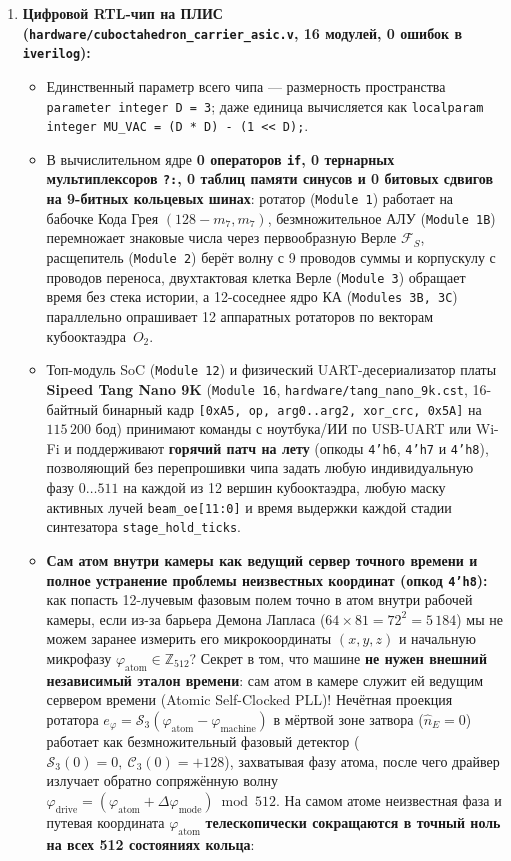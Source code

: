 \begin{enumerate}[label=\textbf{\arabic*.},leftmargin=*]
\item \textbf{Цифровой RTL-чип на ПЛИС (\texttt{hardware/cuboctahedron\_carrier\_asic.v}, 16 модулей, 0 ошибок в \texttt{iverilog}):}
  \begin{itemize}[noitemsep]
  \item Единственный параметр всего чипа --- размерность пространства \texttt{parameter integer D = 3}; даже единица вычисляется как \texttt{localparam integer MU\_VAC = (D * D) - (1 << D);}.
  \item В вычислительном ядре \textbf{0 операторов \texttt{if}, 0 тернарных мультиплексоров \texttt{?:}, 0 таблиц памяти синусов и 0 битовых сдвигов на 9-битных кольцевых шинах}: ротатор (\texttt{Module~1}) работает на бабочке Кода Грея $(128 - m_7, m_7)$, безмножительное АЛУ (\texttt{Module~1B}) перемножает знаковые числа через первообразную Верле $\mathcal{F}_S$, расщепитель (\texttt{Module~2}) берёт волну с 9 проводов суммы и корпускулу с проводов переноса, двухтактовая клетка Верле (\texttt{Module~3}) обращает время без стека истории, а 12-соседнее ядро КА (\texttt{Modules~3B, 3C}) параллельно опрашивает 12 аппаратных ротаторов по векторам кубооктаэдра~$O_2$.
  \item Топ-модуль SoC (\texttt{Module~12}) и физический UART-десериализатор платы \textbf{Sipeed Tang Nano 9K} (\texttt{Module~16}, \texttt{hardware/tang\_nano\_9k.cst}, 16-байтный бинарный кадр \texttt{[0xA5, op, arg0..arg2, xor\_crc, 0x5A]} на $115\,200$ бод) принимают команды с ноутбука/ИИ по USB-UART или Wi-Fi и поддерживают \textbf{горячий патч на лету} (опкоды \texttt{4'h6}, \texttt{4'h7} и \texttt{4'h8}), позволяющий без перепрошивки чипа задать любую индивидуальную фазу $0\dots 511$ на каждой из 12 вершин кубооктаэдра, любую маску активных лучей \texttt{beam\_oe[11:0]} и время выдержки каждой стадии синтезатора \texttt{stage\_hold\_ticks}.
  \item \textbf{Сам атом внутри камеры как ведущий сервер точного времени и полное устранение проблемы неизвестных координат (опкод \texttt{4'h8}):}
    как попасть 12-лучевым фазовым полем точно в атом внутри рабочей камеры, если из-за барьера Демона Лапласа ($64\times 81 = 72^2 = 5\,184$) мы не можем заранее измерить его микрокоординаты $(x,y,z)$ и начальную микрофазу $\varphi_{\mathrm{atom}}\in\mathbb{Z}_{512}$? Секрет в том, что машине \textbf{не нужен внешний независимый эталон времени}: сам атом в камере служит ей ведущим сервером времени (Atomic Self-Clocked PLL)! Нечётная проекция ротатора $e_\varphi = \mathcal{S}_3(\varphi_{\mathrm{atom}} - \varphi_{\mathrm{machine}})$ в мёртвой зоне затвора ($\hat{n}_E = 0$) работает как безмножительный фазовый детектор ($\mathcal{S}_3(0) = 0,\ \mathcal{C}_3(0) = +128$), захватывая фазу атома, после чего драйвер излучает обратно сопряжённую волну $\varphi_{\mathrm{drive}} = (\varphi_{\mathrm{atom}} + \Delta\varphi_{\mathrm{mode}})\bmod 512$. На самом атоме неизвестная фаза и путевая координата $\varphi_{\mathrm{atom}}$ \textbf{телескопически сокращаются в точный ноль на всех 512 состояниях кольца}:

\end{itemize}
\end{enumerate}
